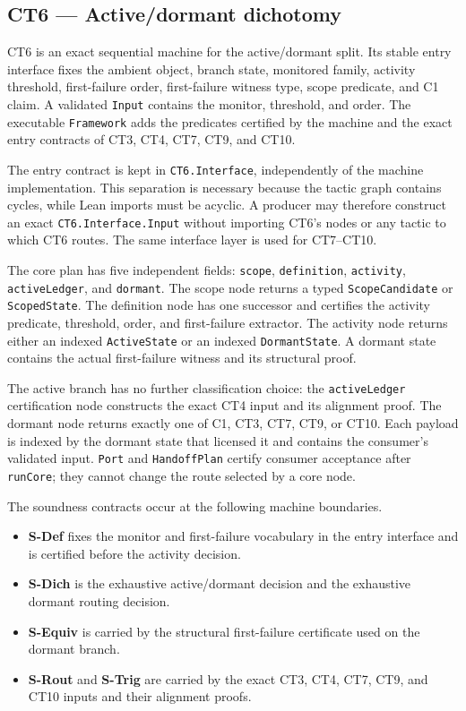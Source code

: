 \subsection{CT6 --- Active/dormant dichotomy}\label{ct:6}\label{the-activedormant-dichotomy}

CT6 is an exact sequential machine for the active/dormant split.  Its stable
entry interface fixes the ambient object, branch state, monitored family,
activity threshold, first-failure order, first-failure witness type, scope
predicate, and C1 claim.  A validated \texttt{Input} contains the monitor,
threshold, and order.  The executable \texttt{Framework} adds the predicates
certified by the machine and the exact entry contracts of CT3, CT4, CT7, CT9,
and CT10.

The entry contract is kept in \texttt{CT6.Interface}, independently of the
machine implementation.  This separation is necessary because the tactic
graph contains cycles, while Lean imports must be acyclic.  A producer may
therefore construct an exact \texttt{CT6.Interface.Input} without importing
CT6's nodes or any tactic to which CT6 routes.  The same interface layer is
used for CT7--CT10.

The core plan has five independent fields: \texttt{scope},
\texttt{definition}, \texttt{activity}, \texttt{activeLedger}, and
\texttt{dormant}.  The scope node returns a typed \texttt{ScopeCandidate} or
\texttt{ScopedState}.  The definition node has one successor and certifies
the activity predicate, threshold, order, and first-failure extractor.  The
activity node returns either an indexed \texttt{ActiveState} or an indexed
\texttt{DormantState}.  A dormant state contains the actual first-failure
witness and its structural proof.

The active branch has no further classification choice: the
\texttt{activeLedger} certification node constructs the exact CT4 input and
its alignment proof.  The dormant node returns exactly one of C1, CT3, CT7,
CT9, or CT10.  Each payload is indexed by the dormant state that licensed it
and contains the consumer's validated input.  \texttt{Port} and
\texttt{HandoffPlan} certify consumer acceptance after \texttt{runCore}; they
cannot change the route selected by a core node.

The soundness contracts occur at the following machine boundaries.
\begin{itemize}
\tightlist
\item \textbf{S-Def} fixes the monitor and first-failure vocabulary in the entry interface and is certified before the activity decision.
\item \textbf{S-Dich} is the exhaustive active/dormant decision and the exhaustive dormant routing decision.
\item \textbf{S-Equiv} is carried by the structural first-failure certificate used on the dormant branch.
\item \textbf{S-Rout} and \textbf{S-Trig} are carried by the exact CT3, CT4, CT7, CT9, and CT10 inputs and their alignment proofs.
\end{itemize}

